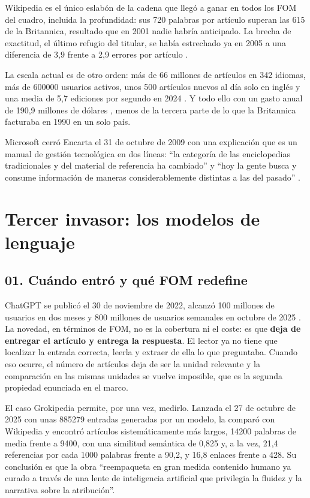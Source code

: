 \documentclass[11pt,letterpaper]{article}
\begin{document}
Wikipedia es el único eslabón de la cadena que llegó a ganar en todos los FOM
del cuadro, incluida la profundidad: sus 720 palabras por artículo superan las
615 de la Britannica, resultado que en 2001 nadie habría anticipado. La brecha
de exactitud, el último refugio del titular, se había estrechado ya en 2005 a
una diferencia de 3,9 frente a 2,9 errores por artículo \parencite{giles2005}.

La escala actual es de otro orden: más de 66 millones de artículos en 342
idiomas, más de \num{600000} usuarios activos, unos \num{500} artículos nuevos al
día solo en inglés y una media de 5,7 ediciones por segundo en 2024
\parencite{pew2026,wikistats2026}. Y todo ello con un gasto anual de 190,9
millones de dólares \parencite{wmf2025}, menos de la tercera parte de lo que la
Britannica facturaba en 1990 en un solo país.

Microsoft cerró Encarta el 31 de octubre de 2009 con una explicación que es un
manual de gestión tecnológica en dos líneas: \enquote{la categoría de las
enciclopedias tradicionales y del material de referencia ha cambiado} y
\enquote{hoy la gente busca y consume información de maneras
considerablemente distintas a las del pasado} \parencite{techcrunch2009}.

\section{Tercer invasor: los modelos de lenguaje}

\subsection*{01. Cuándo entró y qué FOM redefine}

ChatGPT se publicó el 30 de noviembre de 2022, alcanzó 100 millones de usuarios
en dos meses y 800 millones de usuarios semanales en octubre de 2025
\parencite{altman2025}. La novedad, en términos de FOM, no es la cobertura ni el
coste: es que \textbf{deja de entregar el artículo y entrega la respuesta}. El
lector ya no tiene que localizar la entrada correcta, leerla y extraer de ella lo
que preguntaba. Cuando eso ocurre, el número de artículos deja de ser la unidad
relevante y la comparación en las mismas unidades se vuelve imposible, que es la
segunda propiedad enunciada en el marco.

El caso Grokipedia permite, por una vez, medirlo. Lanzada el 27 de octubre de
2025 con unas \num{885279} entradas generadas por un modelo,
\textcite{yasseri2025} la comparó con Wikipedia y encontró artículos
sistemáticamente más largos, \num{14200} palabras de media frente a \num{9400},
con una similitud semántica de 0,825 y, a la vez, 21,4 referencias por cada
\num{1000} palabras frente a 90,2, y 16,8 enlaces frente a 428. Su conclusión es
que la obra \enquote{reempaqueta en gran medida contenido humano ya curado a
través de una lente de inteligencia artificial que privilegia la fluidez y la
narrativa sobre la atribución}.
\end{document}
